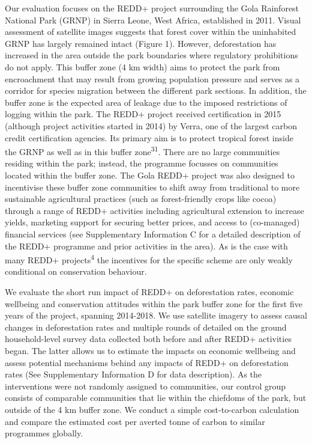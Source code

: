 \documentclass[
]{article}
\begin{document}
Our evaluation focuses on the REDD+ project surrounding the Gola
Rainforest National Park (GRNP) in Sierra Leone, West Africa,
established in 2011. Visual assessment of satellite images suggests that
forest cover within the uninhabited GRNP has largely remained intact
(Figure 1). However, deforestation has increased in the area outside the
park boundaries where regulatory prohibitions do not apply. This buffer
zone (4 km width) aims to protect the park from encroachment that may
result from growing population pressure and serves as a corridor for
species migration between the different park sections. In addition, the
buffer zone is the expected area of leakage due to the imposed
restrictions of logging within the park. The REDD+ project received
certification in 2015 (although project activities started in 2014) by
Verra, one of the largest carbon credit certification agencies. Its
primary aim is to protect tropical forest inside the GRNP as well as in
this buffer zone\textsuperscript{31}. There are no large communities
residing within the park; instead, the programme focusses on communities
located within the buffer zone. The Gola REDD+ project was also designed
to incentivise these buffer zone communities to shift away from
traditional to more sustainable agricultural practices (such as
forest-friendly crops like cocoa) through a range of REDD+ activities
including agricultural extension to increase yields, marketing support
for securing better prices, and access to (co-managed) financial
services (see Supplementary Information C for a detailed description of
the REDD+ programme and prior activities in the area). As is the case
with many REDD+ projects\textsuperscript{4} the incentives for the
specific scheme are only weakly conditional on conservation behaviour.

We evaluate the short run impact of REDD+ on deforestation rates,
economic wellbeing and conservation attitudes within the park buffer
zone for the first five years of the project, spanning 2014-2018. We use
satellite imagery to assess causal changes in deforestation rates and
multiple rounds of detailed on the ground household-level survey data
collected both before and after REDD+ activities began. The latter
allows us to estimate the impacts on economic wellbeing and assess
potential mechanisms behind any impacts of REDD+ on deforestation rates
(See Supplementary Information D for data description). As the
interventions were not randomly assigned to communities, our control
group consists of comparable communities that lie within the chiefdoms
of the park, but outside of the 4 km buffer zone. We conduct a simple
cost-to-carbon calculation and compare the estimated cost per averted
tonne of carbon to similar programmes globally.
\end{document}
